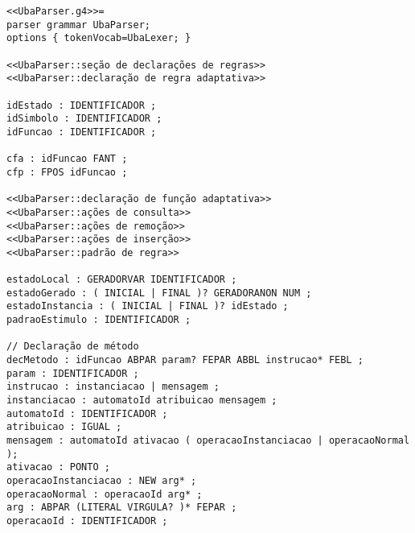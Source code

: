 
\begin{lstlisting}[style=antlr]
<<UbaParser.g4>>=
parser grammar UbaParser;
options { tokenVocab=UbaLexer; }

<<UbaParser::seção de declarações de regras>>
<<UbaParser::declaração de regra adaptativa>>

idEstado : IDENTIFICADOR ;
idSimbolo : IDENTIFICADOR ;
idFuncao : IDENTIFICADOR ;

cfa : idFuncao FANT ;
cfp : FPOS idFuncao ;

<<UbaParser::declaração de função adaptativa>>
<<UbaParser::ações de consulta>>
<<UbaParser::ações de remoção>>
<<UbaParser::ações de inserção>>
<<UbaParser::padrão de regra>>

estadoLocal : GERADORVAR IDENTIFICADOR ;
estadoGerado : ( INICIAL | FINAL )? GERADORANON NUM ;
estadoInstancia : ( INICIAL | FINAL )? idEstado ;
padraoEstimulo : IDENTIFICADOR ;

// Declaração de método
decMetodo : idFuncao ABPAR param? FEPAR ABBL instrucao* FEBL ;
param : IDENTIFICADOR ;
instrucao : instanciacao | mensagem ;
instanciacao : automatoId atribuicao mensagem ;
automatoId : IDENTIFICADOR ;
atribuicao : IGUAL ;
mensagem : automatoId ativacao ( operacaoInstanciacao | operacaoNormal );
ativacao : PONTO ;
operacaoInstanciacao : NEW arg* ;
operacaoNormal : operacaoId arg* ;
arg : ABPAR (LITERAL VIRGULA? )* FEPAR ;
operacaoId : IDENTIFICADOR ;
\end{lstlisting}

